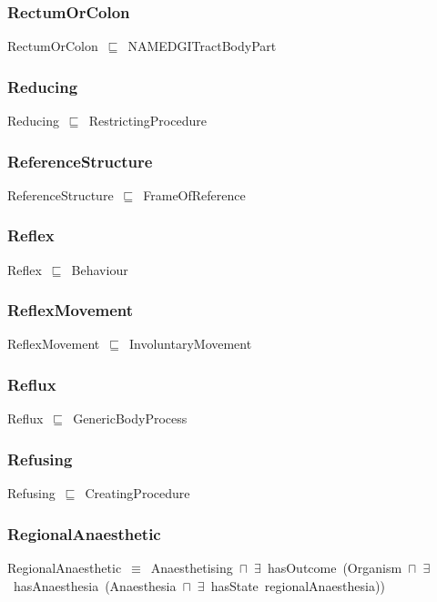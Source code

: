 \documentclass{article}
\begin{document}
\subsubsection*{RectumOrColon}

RectumOrColon~\ensuremath{\sqsubseteq}~NAMEDGITractBodyPart~

\subsubsection*{Reducing}

Reducing~\ensuremath{\sqsubseteq}~RestrictingProcedure~

\subsubsection*{ReferenceStructure}

ReferenceStructure~\ensuremath{\sqsubseteq}~FrameOfReference~

\subsubsection*{Reflex}

Reflex~\ensuremath{\sqsubseteq}~Behaviour~

\subsubsection*{ReflexMovement}

ReflexMovement~\ensuremath{\sqsubseteq}~InvoluntaryMovement~

\subsubsection*{Reflux}

Reflux~\ensuremath{\sqsubseteq}~GenericBodyProcess~

\subsubsection*{Refusing}

Refusing~\ensuremath{\sqsubseteq}~CreatingProcedure~

\subsubsection*{RegionalAnaesthetic}

RegionalAnaesthetic~\ensuremath{\equiv}~Anaesthetising~\ensuremath{\sqcap}~\ensuremath{\exists}~hasOutcome~(Organism~\ensuremath{\sqcap}~\ensuremath{\exists}~hasAnaesthesia~(Anaesthesia~\ensuremath{\sqcap}~\ensuremath{\exists}~hasState~regionalAnaesthesia))
\end{document}
